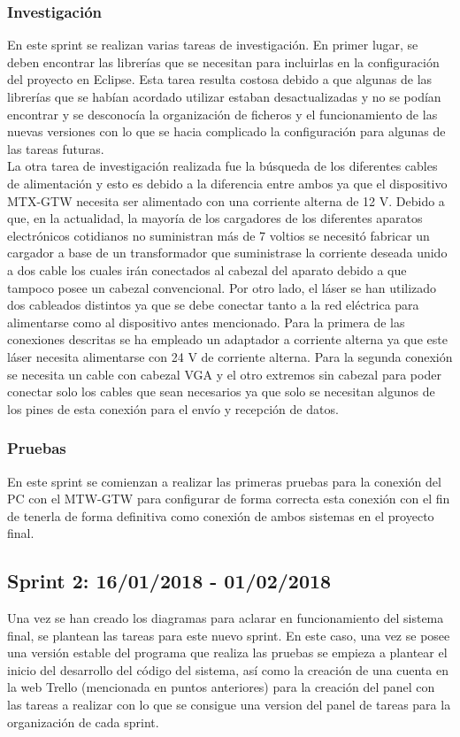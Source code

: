 \subsubsection{Investigación}
En este sprint se realizan varias tareas de investigación. En primer lugar, se deben encontrar las librerías que se necesitan para incluirlas en la configuración del proyecto en Eclipse. Esta tarea resulta costosa debido a que algunas de las librerías que se habían acordado utilizar estaban desactualizadas y no se podían encontrar y se desconocía la organización de ficheros y el funcionamiento de las nuevas versiones con lo que se hacia complicado la configuración para algunas de las tareas futuras.\\
La otra tarea de investigación realizada fue la búsqueda de los diferentes cables de alimentación y esto es debido a la diferencia entre ambos ya que el dispositivo MTX-GTW necesita ser alimentado con una corriente alterna de 12 V. Debido a que, en la actualidad, la mayoría de los cargadores de los diferentes aparatos electrónicos cotidianos no suministran más de 7 voltios se necesitó fabricar un cargador a base de un transformador que suministrase la corriente deseada unido a dos cable los cuales irán conectados al cabezal del aparato debido a que tampoco posee un cabezal convencional. Por otro lado, el láser  se han utilizado dos cableados distintos ya que se debe conectar tanto a la red eléctrica para alimentarse como al dispositivo antes mencionado. Para la primera de las conexiones descritas se ha empleado un adaptador a corriente alterna ya que este láser necesita alimentarse con 24 V de corriente alterna. Para la segunda conexión se necesita un cable con cabezal VGA y el otro extremos sin cabezal para poder conectar solo los cables que sean necesarios ya que solo se necesitan algunos de los pines de esta conexión para el envío y recepción de datos.\\

\subsubsection{Pruebas}
En este sprint se comienzan a realizar las primeras pruebas para la conexión del PC con el MTW-GTW para configurar de forma correcta esta conexión con el fin de tenerla de forma definitiva como conexión de ambos sistemas en el proyecto final.\\

\subsection{Sprint 2: 16/01/2018 - 01/02/2018}
Una vez se han creado los diagramas para aclarar en funcionamiento del sistema final, se plantean las tareas para este nuevo sprint. En este caso, una vez se posee una versión estable del programa que realiza las pruebas se empieza a plantear el inicio del desarrollo del código del sistema, así como la creación de una cuenta en la web Trello (mencionada en puntos anteriores) para la creación del panel con las tareas a realizar con lo que se consigue una version del panel de tareas para la organización de cada sprint.\\
